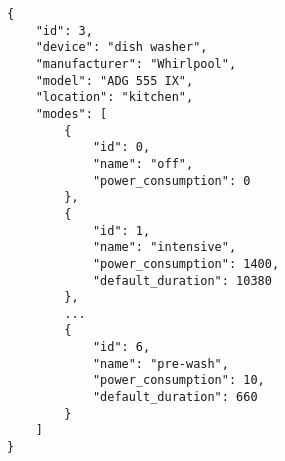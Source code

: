 \begin{lstlisting}[language=numbered,caption={[JSON file describing the dish washer]JSON file describing the dish washer.},label=code:appliance_dish_washer,float,floatplacement=H]
{
	"id": 3,
	"device": "dish washer",
	"manufacturer": "Whirlpool",
	"model": "ADG 555 IX",
	"location": "kitchen",
	"modes": [
		{
			"id": 0,
			"name": "off",
			"power_consumption": 0
		},
		{
			"id": 1,
			"name": "intensive",
			"power_consumption": 1400,
			"default_duration": 10380
		},
		...	
		{
			"id": 6,
			"name": "pre-wash",
			"power_consumption": 10,
			"default_duration": 660
		}
	]
}
\end{lstlisting}